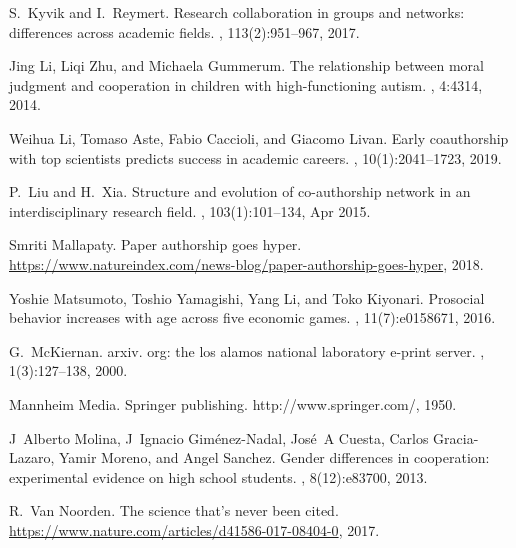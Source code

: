 \documentclass{article}
\theoremstyle{definition}
\begin{document}
\begin{thebibliography}{10}
    S.~Kyvik and I.~Reymert.
    \newblock Research collaboration in groups and networks: differences across
      academic fields.
    , 113(2):951--967, 2017.
    
    Jing Li, Liqi Zhu, and Michaela Gummerum.
    \newblock The relationship between moral judgment and cooperation in children
      with high-functioning autism.
    , 4:4314, 2014.
    
    Weihua Li, Tomaso Aste, Fabio Caccioli, and Giacomo Livan.
    \newblock Early coauthorship with top scientists predicts success in academic
      careers.
    , 10(1):2041--1723, 2019.
    
    P.~Liu and H.~Xia.
    \newblock Structure and evolution of co-authorship network in an
      interdisciplinary research field.
    , 103(1):101--134, Apr 2015.
    
    Smriti Mallapaty.
    \newblock Paper authorship goes hyper.
    \newblock
      \url{https://www.natureindex.com/news-blog/paper-authorship-goes-hyper},
      2018.
    
    Yoshie Matsumoto, Toshio Yamagishi, Yang Li, and Toko Kiyonari.
    \newblock Prosocial behavior increases with age across five economic games.
    , 11(7):e0158671, 2016.
    
    G.~McKiernan.
    \newblock arxiv. org: the los alamos national laboratory e-print server.
    , 1(3):127--138, 2000.
    
    Mannheim Media.
    \newblock Springer publishing.
    \newblock http://www.springer.com/, 1950.
    
    J~Alberto Molina, J~Ignacio Gim{\'e}nez-Nadal, Jos{\'e}~A Cuesta, Carlos
      Gracia-Lazaro, Yamir Moreno, and Angel Sanchez.
    \newblock Gender differences in cooperation: experimental evidence on high
      school students.
    , 8(12):e83700, 2013.
    
    R.~Van Noorden.
    \newblock The science that’s never been cited.
    \newblock \url{https://www.nature.com/articles/d41586-017-08404-0}, 2017.
    

\end{thebibliography}
\end{document}
